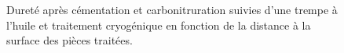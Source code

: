 \begin{figure}[h]
  \hfill

  \caption{\label{fig:hardness_as_quenched}Dureté après cémentation et carbonitruration suivies d'une trempe à l'huile et traitement cryogénique en fonction de la distance à la surface des pièces traitées.}
\end{figure}

